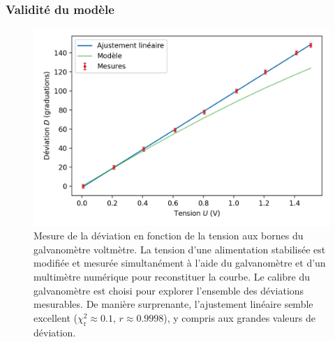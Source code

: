 \documentclass[12pt,a4paper,fleqn]{article}
\begin{document}
\subsubsection{Validité du modèle}

\begin{figure}[htbp]
    \center
    \includegraphics[scale=1]{images/galva_lin.png}
    \caption{Mesure de la déviation en fonction de la tension aux bornes du galvanomètre voltmètre.
    La tension d'une alimentation stabilisée est modifiée et mesurée simultanément à l'aide du galvanomètre et d'un multimètre numérique pour reconstituer la courbe.
    Le calibre du galvanomètre est choisi pour explorer l'ensemble des déviations mesurables.
    De manière surprenante, l'ajustement linéaire semble excellent ($\chi^2_\mathrm{r} \approx \num{0.1}$, $r\approx\num{0.9998}$), y compris aux \og grandes \fg{} valeurs de déviation.
}
    \label{fig:galva_lin}
\end{figure}
\end{document}
